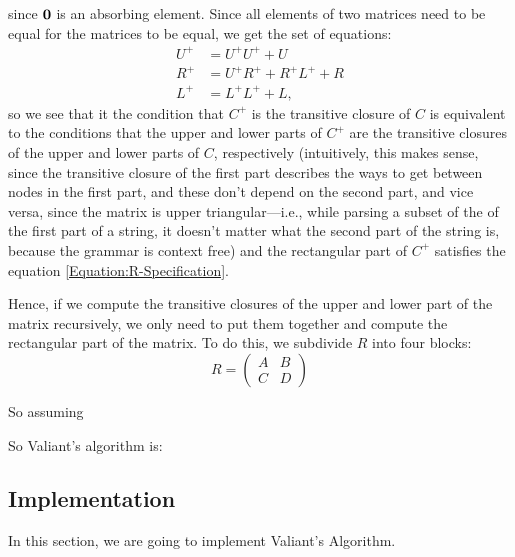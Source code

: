 \documentclass{article}
\begin{document}
since $\mathbf{0}$ is an absorbing element. Since all elements of two matrices need to be equal for the matrices to be equal, we get the set of equations:
\begin{align}
  U^+ &= U^+U^+ + U \\
  R^+ &= U^+R^+ + R^+L^+ + R \label{Equation:R-Specification}\\
  L^+ &= L^+L^+ + L,
\end{align}
so we see that it the condition that $C^+$ is the transitive closure of $C$ is equivalent to the conditions that the upper and lower parts of $C^+$ are the transitive closures of the upper and lower parts of $C$, respectively (intuitively, this makes sense, since the transitive closure of the first part describes the ways to get between nodes in the first part, and these don't depend on the second part, and vice versa, since the matrix is upper triangular---i.e., while parsing a subset of the of the first part of a string, it doesn't matter what the second part of the string is, because the grammar is context free) and the rectangular part of $C^+$ satisfies the equation \eqref{Equation:R-Specification}.

Hence, if we compute the transitive closures of the upper and lower part of the matrix recursively, we only need to put them together and compute the rectangular part of the matrix.
To do this, we subdivide $R$ into four blocks:
\begin{equation*}
  R =
  \begin{pmatrix}
    A & B \\ 
    C & D
  \end{pmatrix}
\end{equation*}

So assuming 

So Valiant's algorithm is: 

\subsection{Implementation}
In this section, we are going to implement Valiant's Algorithm.
\end{document}
